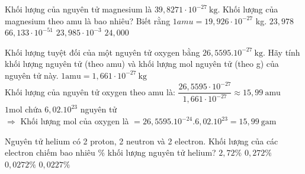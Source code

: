 \begin{vdex}
	Khối lượng của nguyên tử magnesium là $39{,}8271 \cdot 10^{-27} \mathrm{~kg}$. Khối lượng của magnesium theo amu là bao nhiêu? Biết rằng $1amu=19{,}926 \cdot 10^{-27}$ kg.
	\choice
	{\True $ 23{,}978 $}
	{$66{,}133 \cdot 10^{-51}$}
	{$23{,}985 \cdot 10^{-3}$}
	{$ 24{,}000 $}
\end{vdex}
\begin{vdex}
	Khối lượng tuyệt đối của một nguyên tử oxygen bằng $26,5595.10^{-27} \mathrm{~kg}$. Hãy tính khối lượng nguyên tử (theo amu) và khối lượng mol nguyên tử (theo g) của nguyên tử này.
	\loigiai
	{%
		$
		1 \mathrm{amu}=1,661 \cdot 10^{-27} \mathrm{~kg}
		$\\
		Khối lượng của nguyên tử oxygen theo amu là:
		$
		\dfrac{26,5595 \cdot 10^{-27}}{1,661 \cdot 10^{-27}} \approx 15,99~ \mathrm{amu}
		$\\
		$1 \mathrm{mol}$ chứa $ 6,02.10^{23} $ nguyên tử\\
		$\Rightarrow$ Khối lượng mol của oxygen là  $=26,5595.10^{-24}.6,02.10^{23}= 15,99~ \mathrm{gam} $
	}
\end{vdex}
\begin{vdex}
	Nguyên tử helium có 2 proton, 2 neutron và 2 electron. Khối lượng của các electron chiếm bao nhiêu $\%$ khối lượng nguyên tử helium?
	\choice
	{$2,72 \%$}
	{$0,272 \%$}
	{\True$0,0272 \%$}
	{$0,0227 \%$}
\end{vdex}

